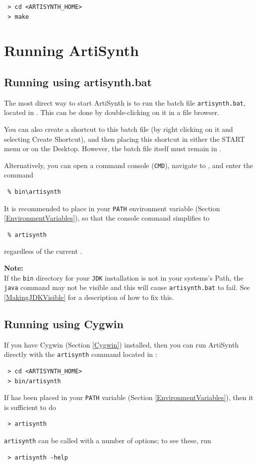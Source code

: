 \begin{verbatim}
 > cd <ARTISYNTH_HOME>
 > make
\end{verbatim}
\fi %

\section{Running ArtiSynth}
\label{Running}

\ifWindows
\subsection{Running using artisynth.bat}
\label{artisynthBat}

The most direct way to start ArtiSynth is to run the batch file
{\tt artisynth.bat}, located in .  This can be
done by double-clicking on it in a file browser.

You can also create a shortcut to this batch file (by right clicking
on it and selecting {\sf Create Shortcut}), and then placing this shortcut
in either the {\sf START} menu or on the Desktop. However, the batch file
itself must remain in .

Alternatively, you can open a command console ({\tt CMD}), navigate
to \ArtHome[], and enter the command
%
\begin{verbatim}
 % bin\artisynth
\end{verbatim}
%
It is recommended to place  
in your {\tt PATH} environment variable (Section \ref{EnvironmentVariables}),
so that the console command simplifies to
\begin{verbatim}
 % artisynth
\end{verbatim}
regardless of the current \directory{}.

\begin{sideblock}
{\bf Note:}\\ If the {\tt bin} directory for your {\tt JDK}
installation is not in your systems's Path, the {\tt java} command may
not be visible and this will cause {\tt artisynth.bat} to fail.
See \ref{MakingJDKVisible} for a description of how to fix this.
\end{sideblock}

\subsection{Running using Cygwin}

If you have Cygwin (Section \ref{Cygwin}) installed, 
then you can run ArtiSynth directly with the {\tt artisynth} command
located in \ArtHome[/bin]:
\begin{verbatim}
 > cd <ARTISYNTH_HOME>
 > bin/artisynth
\end{verbatim}
If \ArtHome[/bin] has been placed in your {\tt PATH}
variable (Section \ref{EnvironmentVariables}), then it
is sufficient to do
\begin{verbatim}
 > artisynth
\end{verbatim}
{\tt artisynth} can be called with a number of options; to see these, run
\begin{verbatim}
 > artisynth -help
\end{verbatim}

